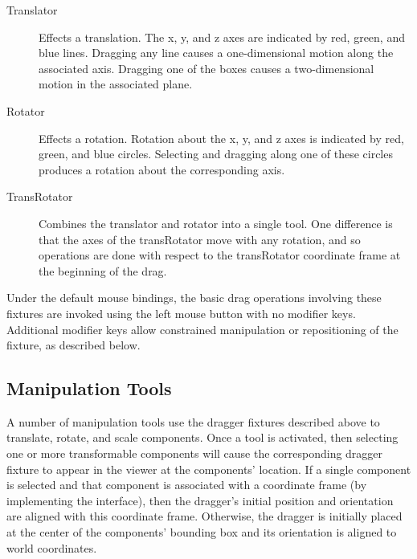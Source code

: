 \documentclass{article}
\begin{document}
\begin{description}

\item[Translator]\mbox{}

Effects a translation. The x, y, and z axes are
indicated by red, green, and blue lines. Dragging any line causes
a one-dimensional motion along the associated axis. Dragging one
of the boxes causes a two-dimensional motion in the associated plane.

\item[Rotator]\mbox{}

Effects a rotation. Rotation about the
x, y, and z axes is indicated by red, green, and blue circles.
Selecting and dragging along one of these circles produces
a rotation about the corresponding axis.

\item[TransRotator]\mbox{}

Combines the translator and rotator into a single tool. One difference
is that the axes of the transRotator move with any rotation,
and so operations are done with respect to the transRotator coordinate frame
at the beginning of the drag.

\end{description}

\begin{sideblock}
Under the default mouse bindings, the basic drag operations involving
these fixtures are invoked using the left mouse button with no
modifier keys. Additional modifier keys allow constrained manipulation
or repositioning of the fixture, as described below.
\end{sideblock}

\subsection{Manipulation Tools}
\label{ManipulationToolsSec}

A number of manipulation tools use the dragger fixtures described
above to translate, rotate, and scale components. Once a tool is
activated, then selecting one or more transformable components will
cause the corresponding dragger fixture to appear in the viewer at the
components' location. If a single component is selected and 
that component is 
associated with a coordinate frame (by implementing the
 interface), 
then the dragger's initial position
and orientation are aligned with this coordinate frame.
Otherwise, the dragger is initially placed at the center of the
components' bounding box and its orientation is aligned to world
coordinates.
\end{document}
